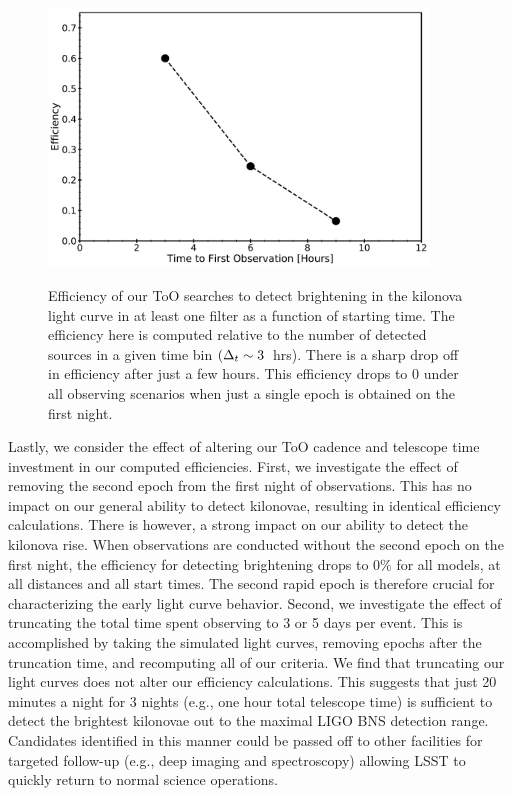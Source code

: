 \begin{figure}[!t]
\begin{center}
\hspace*{-0.1in}
\scalebox{1.}
{\includegraphics[width=0.9\textwidth]{./figs/chapter6/f6.pdf}}
\caption{\singlespace Efficiency of our ToO searches to detect brightening in the kilonova light curve in at least one filter as a function of starting time. The efficiency here is computed relative to the number of detected sources in a given time bin $(\Delta_t \sim3$~hrs). There is a sharp drop off in efficiency after just a few hours. This efficiency drops to 0 under all observing scenarios when just a single epoch is obtained on the first night.}
\label{fig:ch6_snana_t_eff}
\end{center}
\end{figure}

Lastly, we consider the effect of altering our ToO cadence and telescope time investment in our computed efficiencies. First, we investigate the effect of removing the second epoch from the first night of observations. This has no impact on our general ability to detect kilonovae, resulting in identical efficiency calculations. There is however, a strong impact on our ability to detect the kilonova rise. When observations are conducted without the second epoch on the first night, the efficiency for detecting brightening drops to 0\% for all models, at all distances and all start times. The second rapid epoch is therefore crucial for characterizing the early light curve behavior. Second, we investigate the effect of truncating the total time spent observing to 3 or 5 days per event. This is accomplished by taking the simulated light curves, removing epochs after the truncation time, and recomputing all of our criteria. We find that truncating our light curves does not alter our efficiency calculations. This suggests that just 20 minutes a night for 3 nights (e.g., one hour total telescope time) is sufficient to detect the brightest kilonovae out to the maximal LIGO BNS detection range. Candidates identified in this manner could be passed off to other facilities for targeted follow-up (e.g., deep imaging and spectroscopy) allowing LSST to quickly return to normal science operations.

